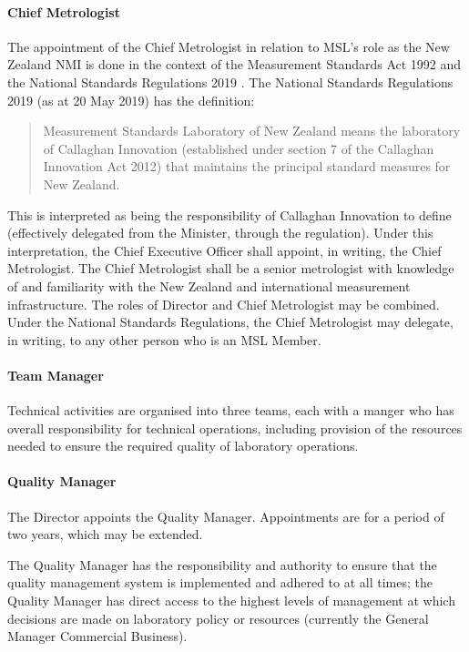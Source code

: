 \paragraph{Chief Metrologist}    

The appointment of the Chief Metrologist in relation to MSL's role as the New Zealand NMI is done in the context of the Measurement Standards Act 1992 \cite{MS_ACT_1992} and the National Standards Regulations 2019 \cite{NS_Regulations}.
The National Standards Regulations 2019 (as at 20 May 2019) has the definition:
\begin{quote}
Measurement Standards Laboratory of New Zealand means the laboratory of Callaghan 
Innovation (established under section 7 of the Callaghan Innovation Act 2012) that maintains 
the principal standard measures for New Zealand.
\end{quote}
This is interpreted as being the responsibility of Callaghan Innovation to define (effectively delegated from the Minister, through the regulation). Under this interpretation, the Chief Executive Officer shall appoint, in writing, the Chief Metrologist. The Chief Metrologist shall be a senior metrologist with knowledge of and familiarity with the New Zealand and international measurement infrastructure. The roles of Director and Chief Metrologist may be combined.
Under the National Standards Regulations, the Chief Metrologist may delegate, in writing, to any other person who is an MSL Member.
\paragraph{Team Manager}
Technical activities are organised into three teams, each with a manger who has overall responsibility for technical operations, including provision of the resources needed to ensure the required quality of laboratory operations. 
\paragraph{Quality Manager}
The Director appoints the Quality Manager. Appointments are for a period of two years, which may be extended. 

The Quality Manager has the responsibility and authority to ensure that the quality management system is implemented and adhered to at all times; the Quality Manager has direct access to the highest levels of management at which decisions are made on laboratory policy or resources (currently the General Manager Commercial Business).

